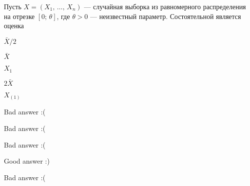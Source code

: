 
\begin{question}
Пусть \(X = (X_1, \, \ldots, \, X_n)\) — случайная выборка из
равномерного распределения на отрезке \([0; \, \theta]\), где
\(\theta > 0\) — неизвестный параметр. Состоятельной является оценка
\begin{answerlist}
  \item \(\bar{X} / 2\)
  \item \(\bar{X}\)
  \item \(X_{1}\)
  \item \(2 \bar{X}\)
  \item \(X_{(1)}\)
\end{answerlist}
\end{question}

\begin{solution}
\begin{answerlist}
  \item Bad answer :(
  \item Bad answer :(
  \item Bad answer :(
  \item Good answer :)
  \item Bad answer :(
\end{answerlist}
\end{solution}


